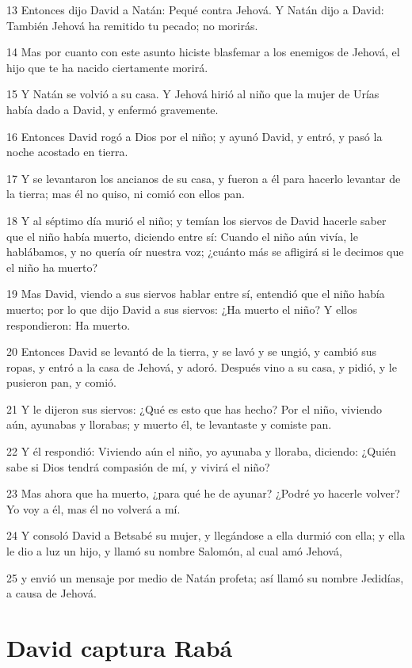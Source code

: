 \par 13 Entonces dijo David a Natán: Pequé contra Jehová. Y Natán dijo a David: También Jehová ha remitido tu pecado; no morirás.
\par 14 Mas por cuanto con este asunto hiciste blasfemar a los enemigos de Jehová, el hijo que te ha nacido ciertamente morirá.
\par 15 Y Natán se volvió a su casa. Y Jehová hirió al niño que la mujer de Urías había dado a David, y enfermó gravemente.
\par 16 Entonces David rogó a Dios por el niño; y ayunó David, y entró, y pasó la noche acostado en tierra.
\par 17 Y se levantaron los ancianos de su casa, y fueron a él para hacerlo levantar de la tierra; mas él no quiso, ni comió con ellos pan.
\par 18 Y al séptimo día murió el niño; y temían los siervos de David hacerle saber que el niño había muerto, diciendo entre sí: Cuando el niño aún vivía, le hablábamos, y no quería oír nuestra voz; ¿cuánto más se afligirá si le decimos que el niño ha muerto?
\par 19 Mas David, viendo a sus siervos hablar entre sí, entendió que el niño había muerto; por lo que dijo David a sus siervos: ¿Ha muerto el niño? Y ellos respondieron: Ha muerto.
\par 20 Entonces David se levantó de la tierra, y se lavó y se ungió, y cambió sus ropas, y entró a la casa de Jehová, y adoró. Después vino a su casa, y pidió, y le pusieron pan, y comió.
\par 21 Y le dijeron sus siervos: ¿Qué es esto que has hecho? Por el niño, viviendo aún, ayunabas y llorabas; y muerto él, te levantaste y comiste pan.
\par 22 Y él respondió: Viviendo aún el niño, yo ayunaba y lloraba, diciendo: ¿Quién sabe si Dios tendrá compasión de mí, y vivirá el niño?
\par 23 Mas ahora que ha muerto, ¿para qué he de ayunar? ¿Podré yo hacerle volver? Yo voy a él, mas él no volverá a mí.
\par 24 Y consoló David a Betsabé su mujer, y llegándose a ella durmió con ella; y ella le dio a luz un hijo, y llamó su nombre Salomón, al cual amó Jehová,
\par 25 y envió un mensaje por medio de Natán profeta; así llamó su nombre Jedidías, a causa de Jehová.

\section*{David captura Rabá}

